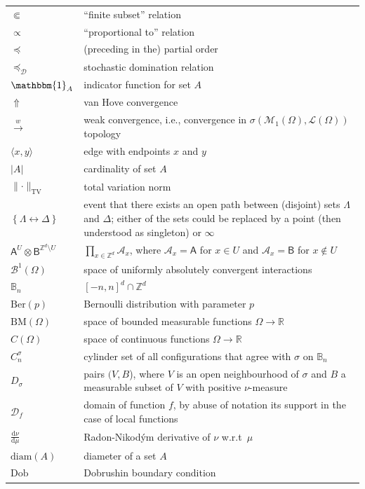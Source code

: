 \documentclass[12pt]{article}
\newcommand{\A}{\mathcal{A}}
\renewcommand{\AA}{\mathsf{A}}
\newcommand{\BB}{\mathscr{B}}
\newcommand{\BBB}{\mathbb{B}}
\newcommand{\AB}{\mathsf{B}}
\newcommand{\D}{\mathcal{D}}
\renewcommand{\d}{\mathrm{d}}
\newcommand{\Loc}{\mathcal{L}}
\newcommand{\M}{\mathcal{M}}
\newcommand{\R}{\mathbb{R}}
\newcommand{\Z}{\mathbb{Z}}
\newcommand{\BM}{\mathrm{BM}}
\newcommand{\TV}{\mathrm{TV}}
\newcommand{\set}[1]{\left\{#1\right\}}
\newcommand{\ra}{\rightarrow}
\newcommand{\pika}{\boldsymbol{\cdot}}
\newcommand{\1}{\mathbbm{1}}
\renewcommand{\sp}[1]{\langle #1\rangle}
\newcommand{\5}{\vspace{0.5cm}}
\theoremstyle{definition}
\begin{document}
\begin{tabular}{p{4cm}p{10cm}}
$\Subset$ & ``finite subset'' relation \\
$\propto$ & ``proportional to'' relation \\
$\preceq$ & (preceding in the) partial order \\
$\preceq_\D$ & stochastic domination relation \\
$\1_A$ & indicator function for set $A$ \\
$\Uparrow$ & van Hove convergence \\
$\xrightarrow{w}$ & weak convergence, i.e., convergence in $\sigma(\M_1(\Omega),\Loc(\Omega))$ topology \\
$\sp{x,y}$ & edge with endpoints $x$ and $y$ \\
$|A|$ & cardinality of set $A$ \\
$\|\!\pika\!\|_\TV$ & total variation norm \\
$\set{\Lambda\leftrightarrow\Delta}$ & event that there exists an open path between (disjoint) sets $\Lambda$ and $\Delta$; either of the sets could be replaced by a point (then understood as singleton) or $\infty$ \\
$\AA^U\otimes\AB^{\Z^d\setminus U}$ & $\prod_{x\in\Z^d}\A_x$, where $\A_x=\AA$ for $x\in U$ and $\A_x=\AB$ for $x\notin U$ \\
$\BB^1(\Omega)$ & space of uniformly absolutely convergent interactions \\
$\BBB_n$ & $[-n,n]^d\cap\Z^d$ \\
$\mathrm{Ber}(p)$ & Bernoulli distribution with parameter $p$ \\
$\BM(\Omega)$ & space of bounded measurable functions $\Omega\ra\R$ \\
$C(\Omega)$ & space of continuous functions $\Omega\ra\R$ \\
$C_n^\sigma$ & cylinder set of all configurations that agree with $\sigma$ on $\BBB_n$ \\
$D_\sigma$ & pairs $(V,B$), where $V$ is an open neighbourhood of $\sigma$ and $B$ a measurable subset of $V$ with positive $\nu$-measure \\
$\D_f$ & domain of function $f$, by abuse of notation its support in the case of local functions \\
$\frac{\d\nu}{\d\mu}$ & Radon-Nikod\'ym derivative of $\nu$ w.r.t~$\mu$ \\
$\mathrm{diam}(A)$ & diameter of a set $A$ \\
$\mathrm{Dob}$ & Dobrushin boundary condition \\

\end{tabular}
\end{document}
